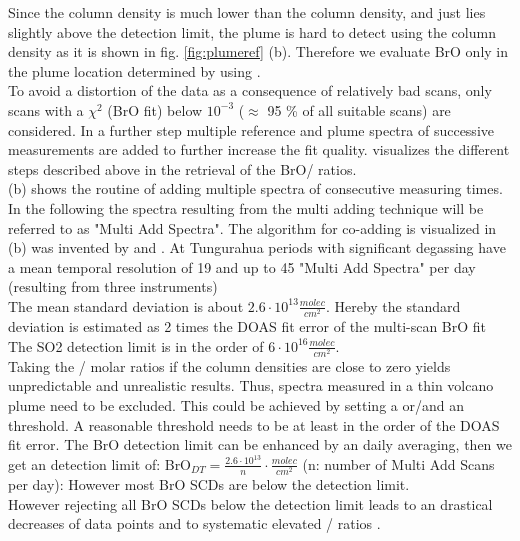 Since the  column density is much lower than the  column density, and just lies slightly above the detection limit, the plume is hard to detect using the  column density as it is shown in fig. \ref{fig:plumeref} (b). 
Therefore we evaluate BrO only in the plume location determined by using .\\
To avoid a distortion of the data as a consequence of relatively bad scans, only scans with a $\chi^2$ (BrO fit) below $10^{-3}$ ($\approx$	95 \% of all suitable scans) are considered.
In a further step multiple reference and plume spectra of successive measurements are added to further increase the fit quality.
 visualizes the different steps described above in the retrieval of the BrO/ ratios.\\
 (b) shows the routine of adding multiple spectra of consecutive measuring times. In the following the spectra resulting from the multi adding technique will be referred to as "Multi Add Spectra". The algorithm for co-adding is visualized in  (b) was invented by \citet{vogel2011volcanic} and \citet{lubcke2014bro}. At Tungurahua periods with significant degassing have a mean temporal resolution of 19 and up to 45 "Multi Add Spectra" per day (resulting from three instruments)\\

The mean standard deviation is about $2.6\cdot10^{13} \frac{molec}{cm^{2}}$. Hereby the standard deviation is estimated as 2 times the DOAS fit error of the multi-scan BrO fit \citet{Stutz:96} \\

The SO2	detection limit is in the order of $6\cdot10^{16}\frac{molec}{cm^{2}}$.\\
%
Taking the / molar ratios if the column densities are close to zero yields unpredictable and unrealistic results. 
Thus, spectra measured in a thin volcano plume need to be excluded.
This could be achieved by setting a  or/and an  threshold. A reasonable  threshold needs to be at least in the order of the DOAS fit error. The BrO detection limit can be enhanced by an daily averaging, then we get an detection limit of: BrO$_{DT}=\frac{2.6\cdot10^{13}}{n}\cdot\frac{molec}{cm^{2}}$ (n: number of Multi Add Scans per day): However most BrO SCDs are below the detection limit.\\
However rejecting all BrO SCDs below the detection limit leads to an drastical decreases of data points and to systematic elevated / ratios  \citep{lubcke2014bro}.\\

